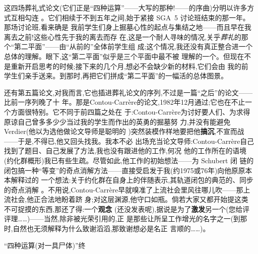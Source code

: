 这四场葬礼式论文(它们正是“四种运算”——大写的那种!——的序曲)分明以许多方式互相勾连
。它们相续于不到五年之间,始于紧接 SGA~5 讨论班结束的那一年。那场讨论班,看来确是
我前学生们身上掘墓心性的起点与集结之地——而且早在我离去之前!这些心性先于我的离去而存
在,这是一个耐人寻味的情况,关乎\emph{葬礼}的那个“第二平面”——由“从前的”全体前学生组
成;这个情况,我还没有真正整合进一个总体的理解。眼下,这“第二平面”似乎是三个平面中最不被
理解的一个。但现在不是重新开启思考的时候;接下来的几个月,想必不会缺少新的材料,它们会由
我的前学生们亲手送来。到那时,再把它们拼成“第二平面”的一幅活的总体图景。

还有第五篇论文,对我而言,它也插进葬礼论文的序列,不过是一篇“之后”的论文——比前一序列晚了十
年。那是Contou-Carrère的论文,1982年12月通过;它也在不止一个方面很特别。它不同于前四篇之处在
于:Contou-Carrère为讨好要人们、为求得原谅自己曾多多少少当过我的学生而作出的英勇的掘墓努
力,并没有能避免Verdier(他以为选他做论文导师是聪明的
)突然装模作样地要把他\textbf{搞沉}\dmark{},不宣而战——于是,不得已,他又回头找我。我本不必
出场充当论文导师:Contou-Carrère自己找到了题目、自己发展了方法,我也没有跟进他的工作,何况
他的工作所在的语境(约化群概形)我已有些生疏。尽管如此,他工作的初始想法——为 Schubert 闭
链的闭包搞一种“等变”的奇点消解方法——直接受启发于我(约1975或76年)向他原原本本解释过的
一个想法:关于约化群在自身上的伴随表示,其轨道闭包的典范的、同步的奇点消解
。不用说,Contou-Carrère早就嗅准了上流社会里风往哪儿吹——那上流社会,他正合法地盼着跻
身;对这层渊源,他守口如瓶。倘若大家又都开始提这类不可捉摸的东西,那还了得:一个\textbf{观念}
(还没发表呢),据说是为了\textbf{激发}另一个(您给评评理……)——当然,除非被光荣引用的,正
是那些让所呈工作增光的名字之一(到那时,自然也无须解释为什么致谢滔滔,那致谢想必是名正
言顺的……)。

\asterisms

\centerline{\headfont “四种运算(对一具尸体)”终}

